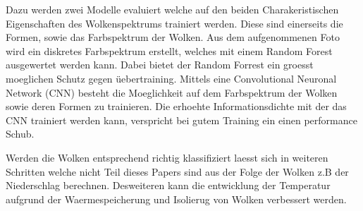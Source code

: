 Dazu werden zwei Modelle evaluiert welche auf den beiden Charakeristischen
Eigenschaften des Wolkenspektrums trainiert werden. 
Diese sind einerseits die Formen, sowie das Farbspektrum der Wolken.
Aus dem aufgenommenen Foto wird ein diskretes Farbspektrum erstellt, welches mit
einem Random Forest ausgewertet werden kann.
Dabei bietet der Random Forrest ein groesst moeglichen Schutz gegen üebertraining.
Mittels eine Convolutional Neuronal Network (CNN) besteht die Moeglichkeit auf
dem Farbspektrum der Wolken sowie deren Formen zu trainieren. 
Die erhoehte Informationsdichte mit der das CNN trainiert werden kann, verspricht bei 
gutem Training ein einen performance Schub.

Werden die Wolken entsprechend richtig klassifiziert laesst sich in weiteren
Schritten welche nicht Teil dieses Papers sind aus der Folge der Wolken z.B
der Niederschlag berechnen. 
Desweiteren kann die entwicklung der Temperatur aufgrund der Waermespeicherung
und Isolierug von Wolken verbessert werden.

